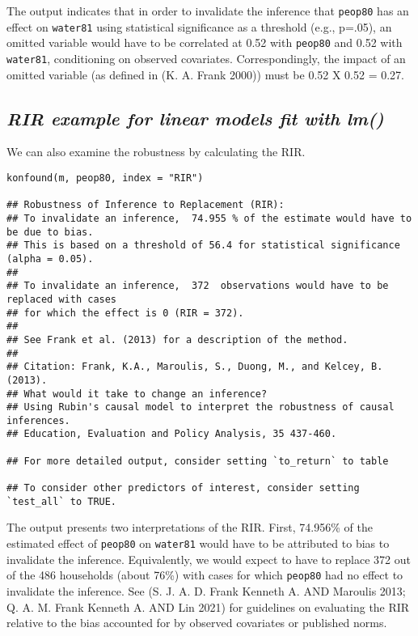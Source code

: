 \documentclass[
]{article}
\begin{document}
The output indicates that in order to invalidate the inference that
\texttt{peop80} has an effect on \texttt{water81} using statistical
significance as a threshold (e.g., p=.05), an omitted variable would
have to be correlated at 0.52 with \texttt{peop80} and 0.52 with
\texttt{water81}, conditioning on observed covariates. Correspondingly,
the impact of an omitted variable (as defined in (K. A. Frank 2000))
must be 0.52 X 0.52 = 0.27.

\hypertarget{rir-example-for-linear-models-fit-with-lm}{%
\subsection{\texorpdfstring{\emph{RIR example for linear models fit with
lm()}}{RIR example for linear models fit with lm()}}\label{rir-example-for-linear-models-fit-with-lm}}

We can also examine the robustness by calculating the RIR.

\begin{verbatim}
konfound(m, peop80, index = "RIR") 

## Robustness of Inference to Replacement (RIR):
## To invalidate an inference,  74.955 % of the estimate would have to be due to bias. 
## This is based on a threshold of 56.4 for statistical significance (alpha = 0.05).
## 
## To invalidate an inference,  372  observations would have to be replaced with cases
## for which the effect is 0 (RIR = 372).
## 
## See Frank et al. (2013) for a description of the method.
## 
## Citation: Frank, K.A., Maroulis, S., Duong, M., and Kelcey, B. (2013).
## What would it take to change an inference?
## Using Rubin's causal model to interpret the robustness of causal inferences.
## Education, Evaluation and Policy Analysis, 35 437-460.

## For more detailed output, consider setting `to_return` to table

## To consider other predictors of interest, consider setting `test_all` to TRUE.
\end{verbatim}

The output presents two interpretations of the RIR. First, 74.956\% of
the estimated effect of \texttt{peop80} on \texttt{water81} would have
to be attributed to bias to invalidate the inference. Equivalently, we
would expect to have to replace 372 out of the 486 households (about
76\%) with cases for which \texttt{peop80} had no effect to invalidate
the inference. See (S. J. A. D. Frank Kenneth A. AND Maroulis 2013; Q.
A. M. Frank Kenneth A. AND Lin 2021) for guidelines on evaluating the
RIR relative to the bias accounted for by observed covariates or
published norms.
\end{document}
